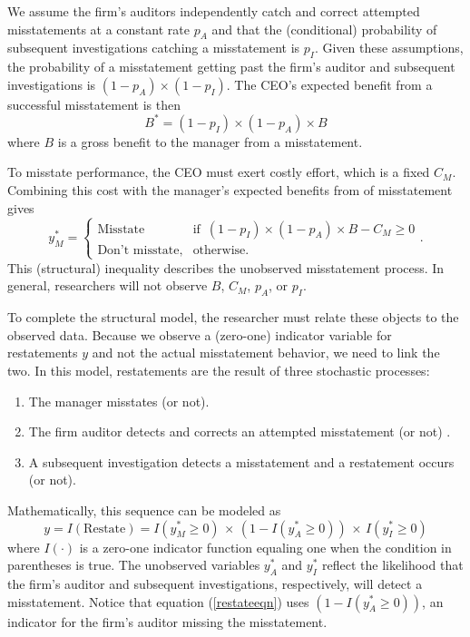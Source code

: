 We assume the firm's auditors independently catch and correct attempted misstatements at a constant rate $p_A$ and that the (conditional) probability of subsequent investigations catching a misstatement is $p_I$.
Given these assumptions, the probability of a misstatement getting past the firm's  auditor and subsequent investigations is $(1-p_A) \times (1 - p_I)$.
The CEO's expected benefit from a successful misstatement is then
$$ B^* = (1-p_I) \times (1-p_A) \times B$$
where $B$ is a gross benefit to the manager from a misstatement. 

To misstate performance, the CEO must exert costly effort, which is a fixed $C_M$. 
Combining this cost with the manager's expected benefits from of misstatement gives
\begin{equation}\label{bencost}
		y_M^* = 
		  \begin{cases}
				\mbox{Misstate} & \mbox{if }\, (1-p_I) \times (1-p_A) \times B - C_M \ge 0\\
				\mbox{Don't misstate,} & \mbox{otherwise}.
		  \end{cases}.
\end{equation}
This (structural) inequality describes the unobserved misstatement process. 
In general, researchers will not observe $B$, $C_M$, $p_A$, or $p_I$.

To complete the structural model, the researcher must relate these objects to the observed data.
Because we observe a (zero-one) indicator variable for restatements $y$ and not the actual misstatement behavior, we need to link the two. 
In this model, restatements are the result of three stochastic processes:
\begin{enumerate}
\item The manager misstates (or not).
\item The firm auditor detects and corrects an attempted misstatement (or not) .
\item A subsequent investigation detects a misstatement and a restatement occurs (or not).
\end{enumerate}

Mathematically, this sequence can be modeled as
\begin{equation}\label{restateeqn}
 y = I(\mbox{Restate}) = I(y^*_M \ge 0) \, \times\, (1 - I(y^*_A \ge 0)) \, \times\, I(y^*_I \ge 0)
\end{equation}
where $I(\cdot)$ is a zero-one indicator function equaling one when the condition in parentheses is true.
The unobserved variables $y^*_A$ and $y^*_I$ reflect the likelihood that the firm's
auditor and subsequent investigations, respectively, will detect a misstatement. 
Notice that equation (\ref{restateeqn}) uses $(1 - I(y^*_A \ge 0))$, an indicator for the firm's auditor missing the misstatement.

